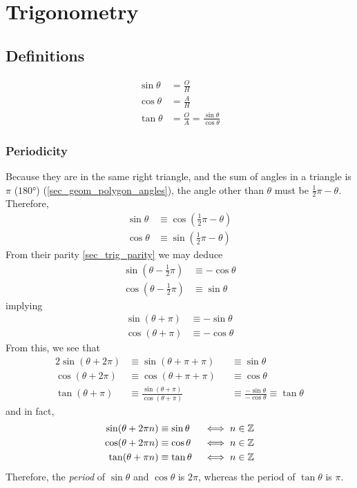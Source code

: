 \section{Trigonometry}

\subsection{Definitions} \label{sec_trig_definitions}


\begin{align}
\sin \theta &= \frac OH \\
\cos \theta &= \frac AH \\
\tan \theta &= \frac OA = \frac{\sin \theta}{\cos \theta}
\end{align}

\subsubsection{Periodicity} \label{sec_trig_periodic}


Because they are in the same right triangle, and the sum of angles in a
triangle is \(\pi\) (\(\ang{180}\)) (\ref{sec_geom_polygon_angles}), the
angle other than \(\theta\) must be \(\frac 12 \pi - \theta\). Therefore,
\begin{align}
\sin \theta &\equiv \cos(\frac 12 \pi - \theta) \\
\cos \theta &\equiv \sin(\frac 12 \pi - \theta)
\end{align}
From their parity \ref{sec_trig_parity} we may deduce
\begin{align}
\sin(\theta - \frac 12 \pi) &\equiv -\cos \theta \\
\cos(\theta - \frac 12 \pi) &\equiv \sin \theta
\end{align}
implying
\begin{align}
\sin(\theta + \pi) &\equiv -\sin \theta \\
\cos(\theta + \pi) &\equiv -\cos \theta
\end{align}
From this, we see that
\begin{alignat}{2}
\sin(\theta + 2\pi) &\equiv \sin(\theta + \pi + \pi) &&\equiv \sin \theta \\
\cos(\theta + 2\pi) &\equiv \cos(\theta + \pi + \pi) &&\equiv \cos \theta \\
\tan(\theta + \pi) &\equiv \frac{\sin(\theta + \pi)}{\cos(\theta + \pi)}
    &&\equiv \frac{-\sin \theta}{-\cos \theta} \equiv \tan \theta
\end{alignat}
and in fact,
\begin{alignat}{2}
\sin(\theta + 2\pi n) &\equiv \sin \theta &&\iff n \in \mathbb Z \\
\cos(\theta + 2\pi n) &\equiv \cos \theta &&\iff n \in \mathbb Z \\
\tan(\theta + \pi n) &\equiv \tan \theta &&\iff n \in \mathbb Z
\end{alignat}
Therefore, the \emph{period} of \(\sin \theta\) and \(\cos \theta\) is
\(2\pi\), whereas the period of \(\tan \theta\) is \(\pi\).


